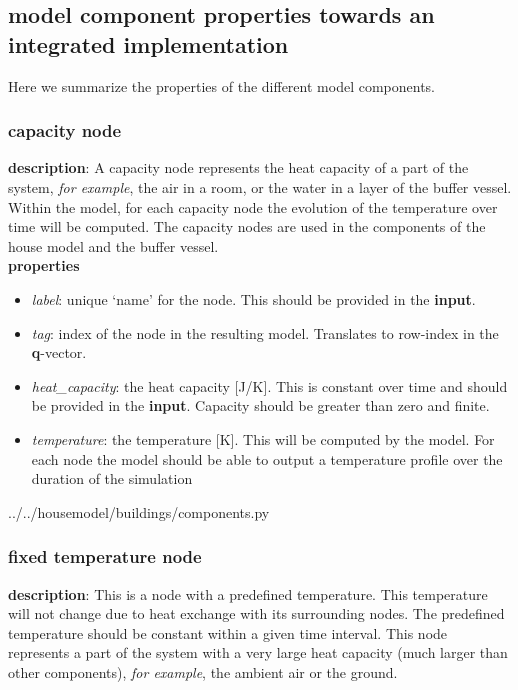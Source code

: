 \subsection{model component properties towards an integrated implementation}
Here we summarize the properties of the different model components. 

\subsubsection{capacity node}

\textbf{description}: A capacity node represents the heat capacity of a part of the system, \textit{for example}, the air in a room, or the water in a layer of the buffer vessel. Within the model, for each capacity node the evolution of the temperature over time will be computed. The capacity nodes are used in the components of the house model and the buffer vessel. 
\\
\textbf{properties}

\begin{itemize}
	\item \emph{label}: unique `name' for the node. This should be provided in the \textbf{input}.
	\item \emph{tag}: index of the node in the resulting model. Translates to row-index in the \textbf{q}-vector.
	\item \emph{heat\_capacity}: the heat capacity [J/K]. This is constant over time and should be provided in the \textbf{input}. Capacity should be greater than zero and finite.  
	\item \emph{temperature}: the temperature [K]. This will be computed by the model. For each node the model should be able to output a temperature profile over the duration of the simulation
\end{itemize}

 
{../../housemodel/buildings/components.py}

\subsubsection{fixed temperature node}
\textbf{description}: This is a node with a predefined temperature. This temperature will not change due to heat exchange with its surrounding nodes. The predefined temperature should be constant within a given time interval. This node represents a part of the system with a very large heat capacity (much larger than other components), \textit{for example}, the ambient air or the ground. 

